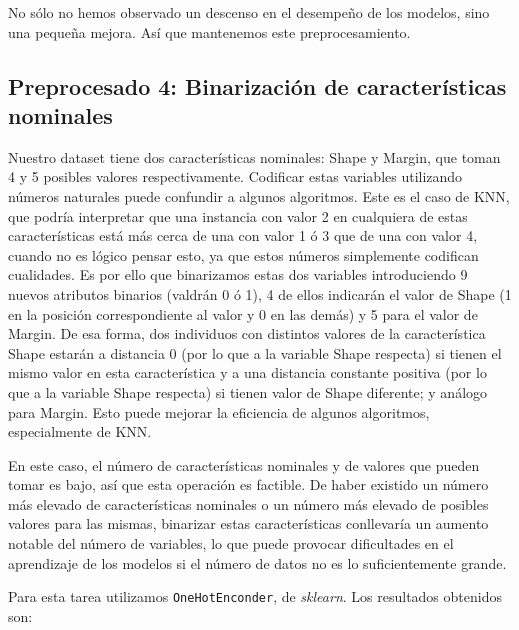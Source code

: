 \documentclass{article}
\begin{document}
No sólo no hemos observado un descenso en el desempeño de los modelos,
sino una pequeña mejora. Así que mantenemos este preprocesamiento.

\subsection{Preprocesado 4: Binarización de características nominales}

Nuestro dataset tiene dos características nominales: Shape y Margin,
que toman 4 y 5 posibles valores respectivamente. Codificar estas
variables utilizando números naturales puede confundir a algunos
algoritmos. Este es el caso de KNN, que podría interpretar que una
instancia con valor 2 en cualquiera de estas características está más
cerca de una con valor 1 ó 3 que de una con valor 4, cuando no es
lógico pensar esto, ya que estos números simplemente codifican
cualidades. Es por ello que binarizamos estas dos variables
introduciendo 9 nuevos atributos binarios (valdrán 0 ó 1), 4 de ellos
indicarán el valor de Shape (1 en la posición correspondiente al valor
y 0 en las demás) y 5 para el valor de Margin. De esa forma, dos
individuos con distintos valores de la característica Shape estarán a
distancia 0 (por lo que a la variable Shape respecta) si tienen el
mismo valor en esta característica y a una distancia constante
positiva (por lo que a la variable Shape respecta) si tienen valor de
Shape diferente; y análogo para Margin. Esto puede mejorar la
eficiencia de algunos algoritmos, especialmente de KNN.

En este caso, el número de características nominales y de valores que
pueden tomar es bajo, así que esta operación es factible. De haber
existido un número más elevado de características nominales o un
número más elevado de posibles valores para las mismas, binarizar
estas características conllevaría un aumento notable del número de
variables, lo que puede provocar dificultades en el aprendizaje de los
modelos si el número de datos no es lo suficientemente grande.

Para esta tarea utilizamos \texttt{OneHotEnconder}, de
\textit{sklearn}. Los resultados obtenidos son:
\end{document}
